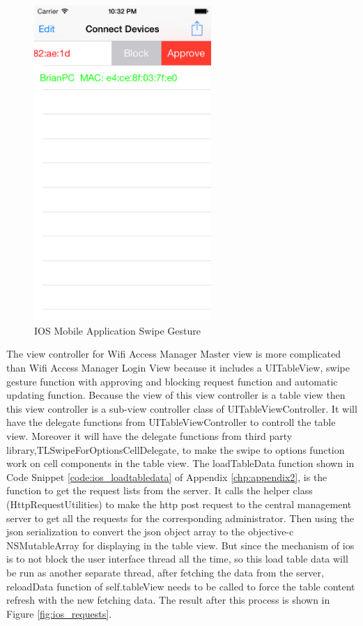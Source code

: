 \begin{figure}
\begin{minipage}{0.45\textwidth}
    		\includegraphics[width=0.6\textwidth,natwidth=610,natheight=642]{figs/ios_app_manage_gesture.png}
  		\caption{IOS Mobile Application Swipe Gesture}
  		\label{fig:ios_swipe}
  	\end{minipage}
\end{figure}

\par The view controller for Wifi Access Manager Master view is more complicated than Wifi Access Manager Login View because it includes a UITableView, swipe gesture function with approving and blocking request function and automatic updating function. Because the view of this view controller is a table view then this view controller is a sub-view controller  class of UITableViewController. It will have the delegate functions from UITableViewController to controll the table view. Moreover it will have the delegate functions from third party library,TLSwipeForOptionsCellDelegate, to make the swipe to options function work on cell components in the table view. The loadTableData function shown in Code Snippet \ref{code:ios_loadtabledata} of Appendix \ref{chp:appendix2}, is the function to get the request lists from the server. It calls the helper class (HttpRequestUtilities) to make the \gls{http} post request to the central management server to get all the requests for the corresponding administrator. Then using the \gls{json} serialization to convert the \gls{json} object array to the objective-c NSMutableArray for displaying in the table view. But since the mechanism of \gls{ios} is to not block the user interface thread all the time, so this load table data will be run as another separate thread, after fetching the data from the server, reloadData function of self.tableView needs to be called to force the table content refresh with the new fetching data. The result after this process is shown in Figure \ref{fig:ios_requests}.

